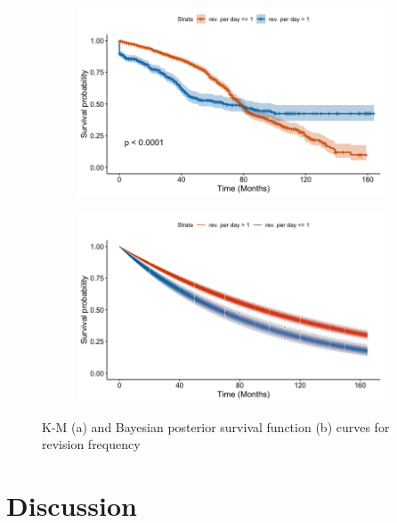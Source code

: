 \documentclass[sigconf]{acmart}
\begin{document}
\begin{figure}
    \centering
    \begin{subfigure}[b]{\columnwidth}
        \centering
        \includegraphics[width=\columnwidth, keepaspectratio=true]{img/KM-rev_freq.jpg}  
        \caption{}
        \label{fig:K-M_curve_for_revision_frequency}
    \end{subfigure}
    \hfill
    \begin{subfigure}[b]{\columnwidth}
        \centering 
        \includegraphics[width=\columnwidth, keepaspectratio=true]{img/commit_freq_bayes.png}
        \caption{}
        \label{fig:Bayesian_curve_for_revision_frequency}
    \end{subfigure}
    \caption{\small K-M (a) and Bayesian posterior survival function (b) curves for revision frequency} 
    \label{fig:Revision frequency}
\end{figure}

\section{Discussion} \label{discussion}
\end{document}
